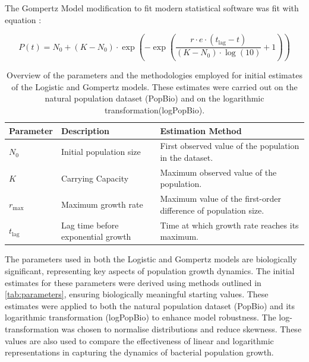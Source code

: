 \documentclass[11pt]{article}
\begin{document}
The Gompertz Model modification to fit modern statistical software was fit with equation \parencite{Gompertz1825, Winsor1932, Pla2015, Buchanan1997}:

\begin{equation}
    P(t) = N_0 + (K - N_0) \cdot \exp\left(-\exp\left(\frac{r \cdot e \cdot (t_{\text{lag}} - t)}{(K - N_0) \cdot \log(10)} + 1\right)\right)
\end{equation}

\begin{sloppy}
    
\begin{table}[H]
    \centering
    \caption{Overview of the parameters and the methodologies employed for initial estimates of the Logistic and Gompertz models. These estimates were carried out on the natural population dataset (PopBio) and on the logarithmic transformation(logPopBio). }
    \renewcommand{\arraystretch}{1.2} %
    \begin{tabularx}{\textwidth}{p{2cm} >{\raggedright}p{4cm} p{7.8cm}} 
        \toprule    
        \textbf{Parameter} & \textbf{Description} & \textbf{Estimation Method} \\
        \midrule
        $N_0$ & Initial population size &  First observed value of the population in the dataset. \\ 
        $K$ & Carrying Capacity & Maximum observed value of the population. \\ 
        $r_{\max}$ & Maximum growth rate &Maximum value of the first-order difference of population size.\\ 
        $t_{\text{lag}}$ &Lag time before exponential growth & Time at which growth rate reaches its maximum. \\
        \bottomrule
    \end{tabularx}
    \label{tab:parameters}
\end{table}
\end{sloppy}
 
The parameters used in both the Logistic and Gompertz models are biologically significant, representing key aspects of population growth dynamics. The initial estimates for these parameters were derived using methods outlined in \autoref{tab:parameters}, ensuring biologically meaningful starting values. These estimates were applied to both the natural population dataset (PopBio) and its logarithmic transformation (logPopBio) to enhance model robustness. The log-transformation was chosen to normalise distributions and reduce skewness.  These values are also used to compare the effectiveness of linear and logarithmic representations in capturing the dynamics of bacterial population growth. 
\end{document}
